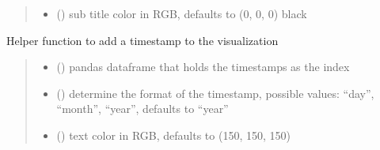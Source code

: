 \documentclass[letterpaper,10pt,english]{sphinxmanual}
\begin{document}
\begin{fulllineitems}
\begin{fulllineitems}
\begin{quote}
\begin{description}
\begin{itemize}
\item {} 
\sphinxAtStartPar
{} () \textendash{} sub title color in RGB, defaults to (0, 0, 0) black

\end{itemize}

\end{description}\end{quote}

\end{fulllineitems}


\begin{fulllineitems}
\label{\detokenize{index:sjvisualizer.Canvas.canvas.add_time}}
\pysigstartsignatures
{}
\pysigstopsignatures
\sphinxAtStartPar
Helper function to add a timestamp to the visualization
\begin{quote}\begin{description}
\begin{itemize}
\item {} 
\sphinxAtStartPar
{} () \textendash{} pandas dataframe that holds the timestamps as the index

\item {} 
\sphinxAtStartPar
{} () \textendash{} determine the format of the timestamp, possible values: “day”, “month”, “year”, defaults to “year”

\item {} 
\sphinxAtStartPar
{} () \textendash{} text color in RGB, defaults to (150, 150, 150)


\end{itemize}
\end{description}
\end{quote}
\end{fulllineitems}
\end{fulllineitems}
\end{document}
